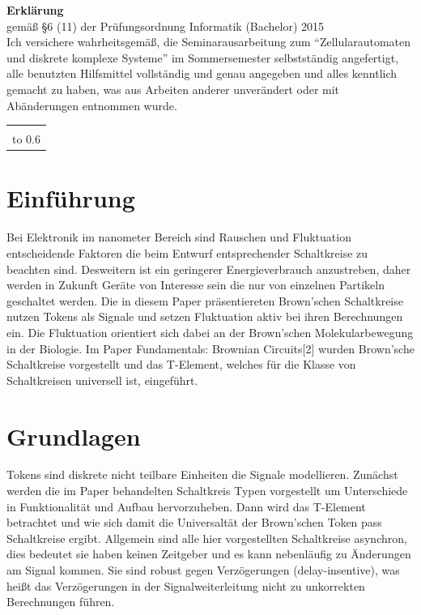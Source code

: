 {\thispagestyle{empty}\raggedright

\noindent \textbf{\Large Erklärung}\\[1ex]
gemäß \S 6 (11) der Prüfungsordnung Informatik %
(Bachelor) 2015 %
\\[\baselineskip]

\noindent
Ich versichere wahrheitsgemäß, die Seminarausarbeitung zum
\seminarart{} "`Zellularautomaten und diskrete komplexe Systeme"' im
Sommersemester \seminarjahr{} selbstständig angefertigt, alle
benutzten Hilfsmittel vollständig und genau angegeben und alles
kenntlich gemacht zu haben, was aus Arbeiten anderer unverändert oder
mit Abänderungen entnommen wurde.

\vspace*{30mm}
\noindent
\begin{tabular}{@{}l}
  \hline
   \\[-1ex]
  \hbox to 0.6\textwidth{(\teilnehmername, Matr.nr.~\teilnehmermatrnr) \hss}
\end{tabular}
}
\clearpage

\section{Einführung}
Bei Elektronik im nanometer Bereich sind Rauschen und Fluktuation 
entscheidende Faktoren die beim Entwurf entsprechender Schaltkreise 
zu beachten sind.
%
Desweitern ist ein geringerer Energieverbrauch anzustreben, daher 
werden in Zukunft Geräte von Interesse sein die nur von einzelnen 
Partikeln geschaltet werden.
%
Die in diesem Paper präsentiereten Brown'schen Schaltkreise nutzen Tokens
als Signale und setzen Fluktuation aktiv bei ihren Berechnungen ein.
Die Fluktuation orientiert sich dabei an der Brown'schen Molekularbewegung 
in der Biologie.
%
Im Paper Fundamentals: Brownian Circuits[2] wurden Brown'sche Schaltkreise 
vorgestellt und das T-Element, welches für die Klasse von Schaltkreisen 
universell ist, eingeführt.



\section{Grundlagen}
Tokens sind diskrete nicht teilbare Einheiten die Signale modellieren.
%
Zunächst werden die im Paper behandelten Schaltkreis Typen vorgestellt 
um Unterschiede in Funktionalität und Aufbau hervorzuheben. 
%
Dann wird das T-Element betrachtet und wie sich damit die Universaltät der
Brown'schen Token pass Schaltkreise ergibt.
%
Allgemein sind alle hier vorgestellten Schaltkreise asynchron, dies bedeutet sie
haben keinen Zeitgeber und es kann nebenläufig zu Änderungen am Signal kommen.
%
Sie sind robust gegen Verzögerungen (delay-insentive), was heißt das Verzögerungen in der Signalweiterleitung
nicht zu unkorrekten Berechnungen führen.


